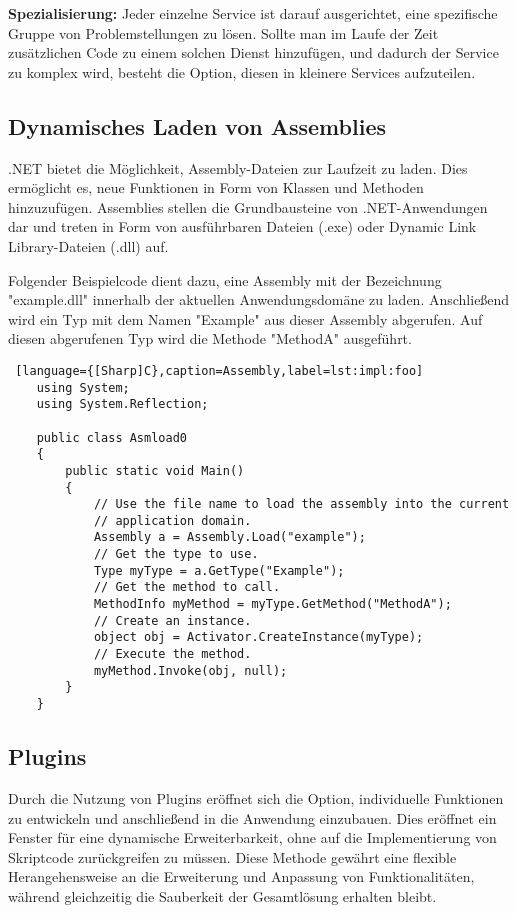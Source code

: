 \textbf{Spezialisierung:}
Jeder einzelne Service ist darauf ausgerichtet, eine spezifische Gruppe von 
Problemstellungen zu lösen. Sollte man im Laufe der Zeit zusätzlichen Code zu einem 
solchen Dienst hinzufügen, und dadurch der Service zu komplex wird, besteht die Option, 
diesen in kleinere Services aufzuteilen.

\cite{microservices}

\newpage
\subsection*{Dynamisches Laden von Assemblies}

.NET bietet die Möglichkeit, Assembly-Dateien zur Laufzeit zu laden. 
Dies ermöglicht es, neue Funktionen in Form von Klassen und Methoden hinzuzufügen. 
Assemblies stellen die Grundbausteine von .NET-Anwendungen dar und treten in Form 
von ausführbaren Dateien (.exe) oder Dynamic Link Library-Dateien (.dll) auf. \cite{assemblies}

Folgender Beispielcode dient dazu, eine Assembly mit der Bezeichnung "example.dll" innerhalb 
der aktuellen Anwendungsdomäne zu laden. Anschließend wird ein Typ mit dem Namen "Example" 
aus dieser Assembly abgerufen. Auf diesen abgerufenen Typ wird die Methode "MethodA" ausgeführt.
\cite{assemblies}

\begin{lstlisting} [language={[Sharp]C},caption=Assembly,label=lst:impl:foo]
    using System;
    using System.Reflection;
    
    public class Asmload0
    {
        public static void Main()
        {
            // Use the file name to load the assembly into the current
            // application domain.
            Assembly a = Assembly.Load("example");
            // Get the type to use.
            Type myType = a.GetType("Example");
            // Get the method to call.
            MethodInfo myMethod = myType.GetMethod("MethodA");
            // Create an instance.
            object obj = Activator.CreateInstance(myType);
            // Execute the method.
            myMethod.Invoke(obj, null);
        }
    }
\end{lstlisting}
\cite{assemblies}

\newpage
\subsection*{Plugins}

Durch die Nutzung von Plugins eröffnet sich die Option, individuelle Funktionen 
zu entwickeln und anschließend in die Anwendung einzubauen. 
Dies eröffnet ein Fenster für eine dynamische Erweiterbarkeit, ohne auf die Implementierung 
von Skriptcode zurückgreifen zu müssen. Diese Methode gewährt eine flexible 
Herangehensweise an die Erweiterung und Anpassung von Funktionalitäten, während 
gleichzeitig die Sauberkeit der Gesamtlösung erhalten bleibt. \cite{pluginframework}

